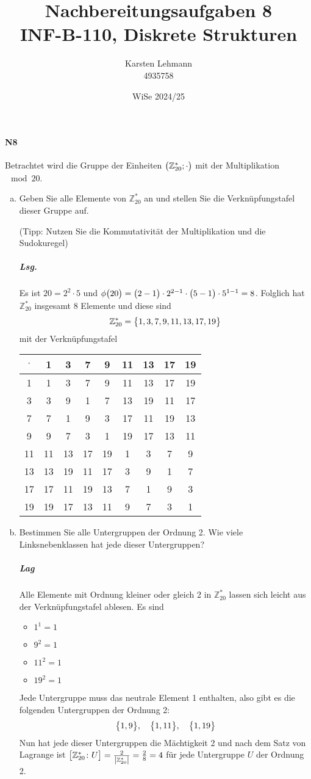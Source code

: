 \documentclass{scrreprt}
\author{Karsten Lehmann \\ 4935758}
\date{WiSe 2024/25}
\title{Nachbereitungsaufgaben 8\\INF-B-110, Diskrete Strukturen}
\begin{document}
\paragraph{N8} Betrachtet wird die Gruppe der Einheiten
$\qty\big(\mathbb{Z}_{20}^*; \cdot)$ mit der Multiplikation $\mod 20$.
\begin{enumerate}[(a)]
\item Geben Sie alle Elemente von $\mathbb{Z}_{20}^*$ an und stellen Sie die
  Verknüpfungstafel dieser Gruppe auf.
  \begin{scriptsize}
    (Tipp: Nutzen Sie die Kommutativität der Multiplikation und die Sudokuregel)
  \end{scriptsize}

  \subparagraph{Lsg.} Es ist $20 = 2^2 \cdot 5$ und $\phi\qty\big(20)
  = \qty\big(2 - 1) \cdot 2^{2 - 1} \cdot \qty\big(5 - 1) \cdot 5^{1 - 1} = 8$.
  Folglich hat $\mathbb{Z}_{20}^*$ insgesamt 8 Elemente und diese sind
  \[
    \mathbb{Z}_{20}^* = \qty\big{1, 3, 7, 9, 11, 13, 17, 19}
  \]
  mit der Verknüpfungstafel

  \begin{tabular}{|c|cccccccc|}
    \hline
    $\cdot$ & 1  & 3  & 7  & 9  & 11 & 13 & 17 & 19 \\
    \hline
    1       & 1  & 3  & 7  & 9  & 11 & 13 & 17 & 19 \\
    3       & 3  & 9  & 1  & 7  & 13 & 19 & 11 & 17 \\
    7       & 7  & 1  & 9  & 3  & 17 & 11 & 19 & 13 \\
    9       & 9  & 7  & 3  & 1  & 19 & 17 & 13 & 11 \\
    11      & 11 & 13 & 17 & 19 & 1  & 3  & 7  & 9  \\
    13      & 13 & 19 & 11 & 17 & 3  & 9  & 1  & 7  \\
    17      & 17 & 11 & 19 & 13 & 7  & 1  & 9  & 3  \\
    19      & 19 & 17 & 13 & 11 & 9  & 7  & 3  & 1  \\
    \hline
  \end{tabular}

\item Bestimmen Sie alle Untergruppen der Ordnung 2.
  Wie viele Linksnebenklassen hat jede dieser Untergruppen?

  \subparagraph{Lag} Alle Elemente mit Ordnung kleiner oder gleich 2 in
  $\mathbb{Z}_{20}^*$ lassen sich leicht aus der Verknüpfungstafel ablesen.
  Es sind
  \begin{itemize}
  \item $1^1 = 1$
  \item $9^2 = 1$
  \item $11^2 = 1$
  \item $19^2 = 1$
  \end{itemize}
  Jede Untergruppe muss das neutrale Element 1 enthalten, also gibt es die
  folgenden Untergruppen der Ordnung 2:
  \[
    \qty\big{1, 9}, \quad
    \qty\big{1, 11}, \quad
    \qty\big{1, 19}
  \]
  Nun hat jede dieser Untergruppen die Mächtigkeit 2 und nach dem Satz von
  Lagrange ist $\qty\big[\mathbb{Z}_{20}^* \colon U]
  = \frac{2}{\abs{\mathbb{Z}_{20}^*}}
  = \frac{2}{8} = 4$ für jede Untergruppe $U$ der Ordnung 2.


\end{enumerate}
\end{document}
